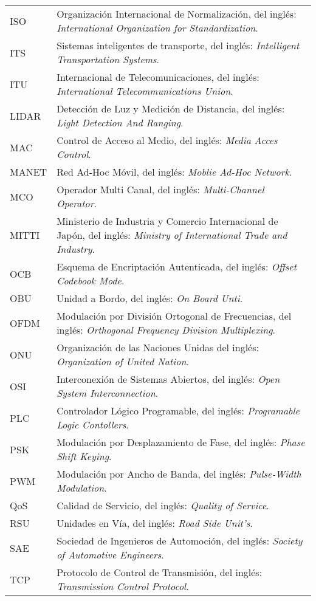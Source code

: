 \pagebreak
\begin{tabular}{p{2cm} p{13.3cm}}
ISO & Organización Internacional de Normalización, del inglés: \textit{International Organization for Standardization}.\\
ITS & Sistemas inteligentes de transporte, del inglés: \textit{Intelligent Transportation Systems}.\\
ITU & Internacional de Telecomunicaciones, del inglés: \textit{International Telecommunications Union}.\\
LIDAR & Detección de Luz y Medición de Distancia, del inglés: \textit{Light Detection And Ranging}.\\
MAC & Control de Acceso al Medio, del inglés: \textit{Media Acces Control}.\\
MANET & Red Ad-Hoc Móvil, del inglés: \textit{Moblie Ad-Hoc Network}.\\
MCO & Operador Multi Canal, del inglés: \textit{Multi-Channel Operator}.\\
MITTI & Ministerio de Industria y Comercio Internacional de Japón, del inglés: \textit{Ministry of International Trade and Industry}.\\
OCB & Esquema de Encriptación Autenticada, del inglés: \textit{ Offset Codebook Mode}.\\
OBU & Unidad a Bordo, del inglés: \textit{On Board Unti}.\\
OFDM & Modulación por División Ortogonal de Frecuencias, del inglés: \textit{Orthogonal Frequency Division Multiplexing}.\\
ONU & Organización de las Naciones Unidas del inglés: \textit{Organization of United Nation}.\\
OSI & Interconexión de Sistemas Abiertos, del inglés: \textit{Open System Interconnection}.\\
PLC & Controlador Lógico Programable, del inglés: \textit{Programable Logic Contollers}.\\
PSK & Modulación por Desplazamiento de Fase, del inglés: \textit{Phase Shift Keying}.\\
PWM & Modulación por Ancho de Banda, del inglés: \textit{Pulse-Width Modulation}.\\
QoS & Calidad de Servicio, del inglés: \textit{Quality of Service}.\\
RSU & Unidades en Vía, del inglés: \textit{ Road Side Unit's}.\\
SAE & Sociedad de Ingenieros de Automoción, del inglés:\textit{ Society of Automotive Engineers}.\\
TCP & Protocolo de Control de Transmisión, del inglés: \textit{Transmission Control Protocol}.\\
\end{tabular}

